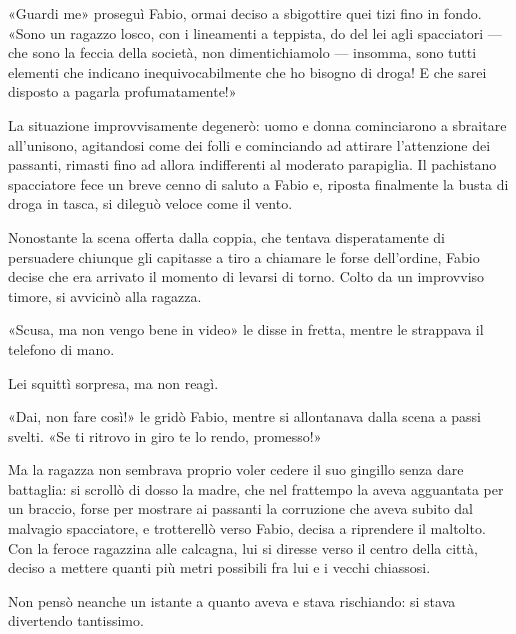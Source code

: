 «Guardi me» proseguì Fabio, ormai deciso a sbigottire quei tizi fino in fondo. «Sono un ragazzo losco, con i lineamenti a teppista, do del lei agli spacciatori --- che sono la feccia della società, non dimentichiamolo --- insomma, sono tutti elementi che indicano inequivocabilmente che ho bisogno di droga! E che sarei disposto a pagarla profumatamente!»

La situazione improvvisamente degenerò: uomo e donna cominciarono a sbraitare all'unisono, agitandosi come dei folli e cominciando ad attirare l'attenzione dei passanti, rimasti fino ad allora indifferenti al moderato parapiglia. Il pachistano spacciatore fece un breve cenno di saluto a Fabio e, riposta finalmente la busta di droga in tasca, si dileguò veloce come il vento.

Nonostante la scena offerta dalla coppia, che tentava disperatamente di persuadere chiunque gli capitasse a tiro a chiamare le forse dell'ordine, Fabio decise che era arrivato il momento di levarsi di torno. Colto da un improvviso timore, si avvicinò alla ragazza.

«Scusa, ma non vengo bene in video» le disse in fretta, mentre le strappava il telefono di mano.

Lei squittì sorpresa, ma non reagì.

«Dai, non fare così!» le gridò Fabio, mentre si allontanava dalla scena a passi svelti. «Se ti ritrovo in giro te lo rendo, promesso!»

Ma la ragazza non sembrava proprio voler cedere il suo gingillo senza dare battaglia: si scrollò di dosso la madre, che nel frattempo la aveva agguantata per un braccio, forse per mostrare ai passanti la corruzione che aveva subito dal malvagio spacciatore, e trotterellò verso Fabio, decisa a riprendere il maltolto. Con la feroce ragazzina alle calcagna, lui si diresse verso il centro della città, deciso a mettere quanti più metri possibili fra lui e i vecchi chiassosi.

Non pensò neanche un istante a quanto aveva e stava rischiando: si stava divertendo tantissimo.
